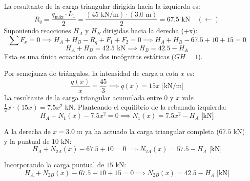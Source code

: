 {    La resultante de la carga triangular dirigida hacia la izquierda es:
    \begin{equation}
        R_q = \frac{q_{\text{máx}} \cdot L_1}{2} = \frac{(45\text{ kN/m}) \cdot (3.0\text{ m})}{2} = 67.5\text{ kN} \quad (\leftarrow)
    \end{equation}
    Suponiendo reacciones $H_A$ y $H_B$ dirigidas hacia la derecha (+x):
    \begin{equation}
        \sum F_x = 0 \implies H_A + H_B - R_q + F_1 + F_2 = 0 \implies H_A + H_B - 67.5 + 10 + 15 = 0
    \end{equation}
    \begin{equation}
        H_A + H_B = 42.5\text{ kN} \implies H_B = 42.5 - H_A
    \end{equation}
    Esta es una única ecuación con dos incógnitas estáticas ($GH = 1$).


    Por semejanza de triángulos, la intensidad de carga a cota $x$ es:
    \begin{equation}
        \frac{q(x)}{x} = \frac{45}{3} \implies q(x) = 15x\text{ [kN/m]}
    \end{equation}
    La resultante de la carga triangular acumulada entre $0$ y $x$ vale $\frac{1}{2} x \cdot (15x) = 7.5x^2\text{ kN}$. Planteando el equilibrio de la rebanada izquierda:
    \begin{equation}
        H_A + N_1(x) - 7.5x^2 = 0 \implies N_1(x) = 7.5x^2 - H_A\text{ [kN]}
    \end{equation}

    A la derecha de $x = 3.0\text{ m}$ ya ha actuado la carga triangular completa ($67.5\text{ kN}$) y la puntual de $10\text{ kN}$:
    \begin{equation}
        H_A + N_{2A}(x) - 67.5 + 10 = 0 \implies N_{2A}(x) = 57.5 - H_A\text{ [kN]}
    \end{equation}

    Incorporando la carga puntual de $15\text{ kN}$:
    \begin{equation}
        H_A + N_{2B}(x) - 67.5 + 10 + 15 = 0 \implies N_{2B}(x) = 42.5 - H_A\text{ [kN]}
    \end{equation}


}

